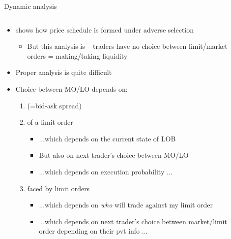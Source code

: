 \documentclass[english,10pt
,aspectratio=169
]{beamer}
\begin{document}
\begin{frame}{Dynamic analysis}
	\begin{columns}
		\begin{column}{0.7\linewidth}
			\begin{itemize}
				\item \cite{glosten_is_1994} shows how price schedule is formed under adverse selection
				\begin{itemize}
					\item But this analysis is  -- traders have no choice between limit/market orders = making/taking liquidity
				\end{itemize}
				\item Proper  analysis is quite difficult
				\pause
				\item Choice between \alert{MO/LO} depends on:
				\begin{enumerate}
					\item {} (=bid-ask spread)
					\item {} of a limit order
					\begin{itemize}
						\item ...which depends on the current state of LOB
						\item But also on next trader's choice between MO/LO
						\item ...which depends on execution probability ...
					\end{itemize}
					\item {} faced by limit orders
					\begin{itemize}
						\item ...which depends on \emph{who} will trade against my limit order
						\item ...which depends on next trader's choice between market/limit order depending on their pvt info ...
					\end{itemize}
				\end{enumerate}
			\end{itemize}
		\end{column}
		\begin{column}{0.3\linewidth}
			\visible<handout:0|1->{
				\texttt{[image: pics/thonk]}
				\vspace{7em}
			}
		\end{column}
	\end{columns}
\end{frame}
\end{document}
